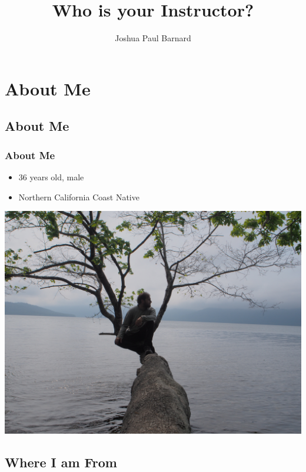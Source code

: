 \documentclass{beamer}
\author{Joshua Paul Barnard}
\title{Who is your Instructor?}
\date{\vspace{-5em}}
\begin{document}
	{
		\begin{frame}
			\vspace{-35pt}
			\maketitle
		\end{frame}
	}


	\section{ About Me }

		\subsection{About Me}
		
				\begin{frame}
			\frametitle{About Me}
			\begin{itemize}
				\item 36 years old, male
				\item Northern California Coast Native
			\end{itemize}
			\begin{center}
				\includegraphics[width = 1.0\textwidth]{images/P6190078.JPG}
			\end{center}
		\end{frame}
	
	\subsection{Where I am From}
	
\end{document}
